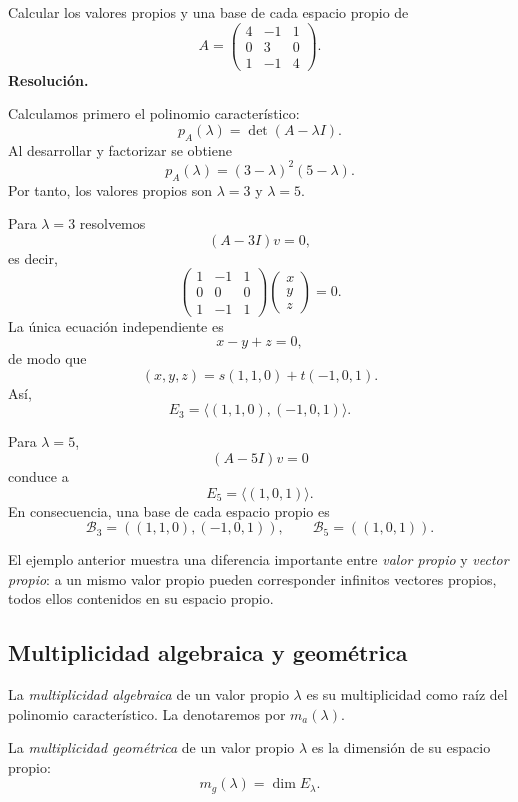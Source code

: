 \begin{solvedexercise}
Calcular los valores propios y una base de cada espacio propio de
\[
A=\begin{pmatrix}
4&-1&1\\
0&3&0\\
1&-1&4
\end{pmatrix}.
\]
\tcblower
\textbf{Resolución.}\par\smallskip
Calculamos primero el polinomio característico:
\[
p_A(\lambda)=\det(A-\lambda I).
\]
Al desarrollar y factorizar se obtiene
\[
p_A(\lambda)=(3-\lambda)^2(5-\lambda).
\]
Por tanto, los valores propios son $\lambda=3$ y $\lambda=5$.

Para $\lambda=3$ resolvemos
\[
(A-3I)v=0,
\]
es decir,
\[
\begin{pmatrix}
1&-1&1\\
0&0&0\\
1&-1&1
\end{pmatrix}
\begin{pmatrix}x\\y\\z\end{pmatrix}=0.
\]
La única ecuación independiente es
\[
x-y+z=0,
\]
de modo que
\[
(x,y,z)=s(1,1,0)+t(-1,0,1).
\]
Así,
\[
E_3=\langle(1,1,0),(-1,0,1)\rangle.
\]

Para $\lambda=5$,
\[
(A-5I)v=0
\]
conduce a
\[
E_5=\langle(1,0,1)\rangle.
\]
En consecuencia, una base de cada espacio propio es
\[
\boxed{\mathcal B_3=((1,1,0),(-1,0,1)),\qquad
\mathcal B_5=((1,0,1)).}
\]
\end{solvedexercise}

El ejemplo anterior muestra una diferencia importante entre \emph{valor propio} y \emph{vector propio}: a un mismo valor propio pueden corresponder infinitos vectores propios, todos ellos contenidos en su espacio propio.

\subsection{Multiplicidad algebraica y geométrica}

\begin{definition}
La \emph{multiplicidad algebraica} de un valor propio $\lambda$ es su multiplicidad como raíz del polinomio característico. La denotaremos por $m_a(\lambda)$.
\end{definition}

\begin{definition}
La \emph{multiplicidad geométrica} de un valor propio $\lambda$ es la dimensión de su espacio propio:
\[
m_g(\lambda)=\dim E_\lambda.
\]
\end{definition}

